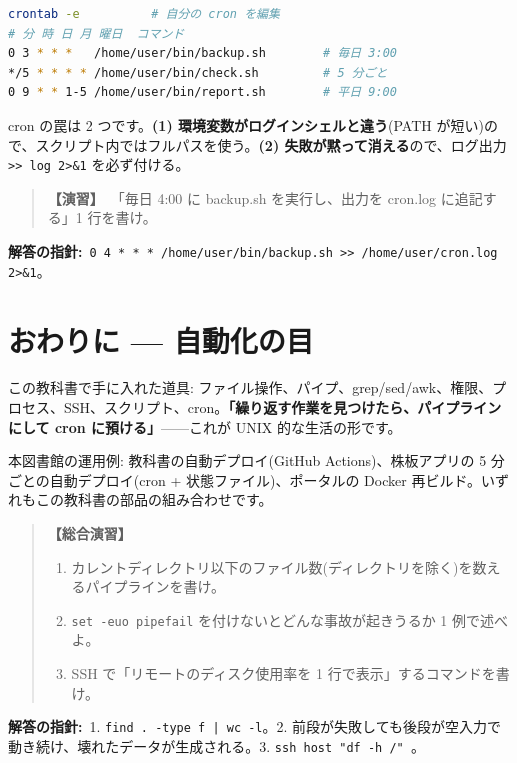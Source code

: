 \documentclass{article}
\begin{document}
\begin{lstlisting}[language=bash]
crontab -e          # 自分の cron を編集
# 分 時 日 月 曜日  コマンド
0 3 * * *   /home/user/bin/backup.sh        # 毎日 3:00
*/5 * * * * /home/user/bin/check.sh         # 5 分ごと
0 9 * * 1-5 /home/user/bin/report.sh        # 平日 9:00
\end{lstlisting}

cron の罠は 2 つです。\textbf{(1) 環境変数がログインシェルと違う}(PATH が短い)ので、スクリプト内ではフルパスを使う。\textbf{(2) 失敗が黙って消える}ので、ログ出力 \texttt{>> log 2>\&1} を必ず付ける。

\begin{quote}
\textbf{【演習】}\ 「毎日 4:00 に backup.sh を実行し、出力を cron.log に追記する」1 行を書け。
\end{quote}

\textbf{解答の指針:}\ \texttt{0 4 * * * /home/user/bin/backup.sh >> /home/user/cron.log 2>\&1}。

\section{おわりに — 自動化の目}

この教科書で手に入れた道具: ファイル操作、パイプ、grep/sed/awk、権限、プロセス、SSH、スクリプト、cron。\textbf{「繰り返す作業を見つけたら、パイプラインにして cron に預ける」}——これが UNIX 的な生活の形です。

本図書館の運用例: 教科書の自動デプロイ(GitHub Actions)、株板アプリの 5 分ごとの自動デプロイ(cron + 状態ファイル)、ポータルの Docker 再ビルド。いずれもこの教科書の部品の組み合わせです。

\begin{quote}
\textbf{【総合演習】}
\begin{enumerate}
\item カレントディレクトリ以下のファイル数(ディレクトリを除く)を数えるパイプラインを書け。
\item \texttt{set -euo pipefail} を付けないとどんな事故が起きうるか 1 例で述べよ。
\item SSH で「リモートのディスク使用率を 1 行で表示」するコマンドを書け。
\end{enumerate}
\end{quote}

\textbf{解答の指針:}\ 1. \texttt{find . -type f | wc -l}。2. 前段が失敗しても後段が空入力で動き続け、壊れたデータが生成される。3. \texttt{ssh host "df -h /" }。
\end{document}
